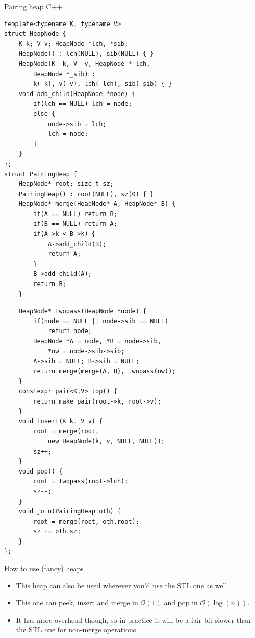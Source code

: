 \documentclass{beamer}
\begin{document}
\begin{frame}{Pairing heap C++}
    \tiny
    \begin{multicols}{2}
    \begin{verbatim}
template<typename K, typename V>
struct HeapNode {
    K k; V v; HeapNode *lch, *sib;
    HeapNode() : lch(NULL), sib(NULL) { }
    HeapNode(K _k, V _v, HeapNode *_lch, 
        HeapNode *_sib) :
        k(_k), v(_v), lch(_lch), sib(_sib) { }
    void add_child(HeapNode *node) {
        if(lch == NULL) lch = node;
        else {
            node->sib = lch;
            lch = node;
        }
    }
};
struct PairingHeap {
    HeapNode* root; size_t sz;
    PairingHeap() : root(NULL), sz(0) { }
    HeapNode* merge(HeapNode* A, HeapNode* B) {
        if(A == NULL) return B;
        if(B == NULL) return A;
        if(A->k < B->k) {
            A->add_child(B);
            return A;
        }
        B->add_child(A);
        return B;
    }
    \end{verbatim}
    \columnbreak
    \begin{verbatim}
    HeapNode* twopass(HeapNode *node) {
        if(node == NULL || node->sib == NULL) 
            return node;
        HeapNode *A = node, *B = node->sib, 
            *nw = node->sib->sib;
        A->sib = NULL; B->sib = NULL;
        return merge(merge(A, B), twopass(nw));
    }
    constexpr pair<K,V> top() {
        return make_pair(root->k, root->v);
    }
    void insert(K k, V v) {
        root = merge(root, 
            new HeapNode(k, v, NULL, NULL));
        sz++;
    }
    void pop() {
        root = twopass(root->lch);
        sz--;
    }
    void join(PairingHeap oth) {
        root = merge(root, oth.root);
        sz += oth.sz;
    }
};
    \end{verbatim}
    \end{multicols}
\end{frame}

\begin{frame}[plain]{How to use (fancy) heaps}
    \begin{itemize}
        \item This heap can also be used wherever you'd use the STL one as well.
        \item This one can peek, insert and merge in $\mathcal{O}(1)$ and pop in $\mathcal{O}(\log(n))$.
        \item It has more overhead though, so in practice it will be a fair bit slower than the STL one for non-merge operations.
    \end{itemize}
\end{frame}
\end{document}

